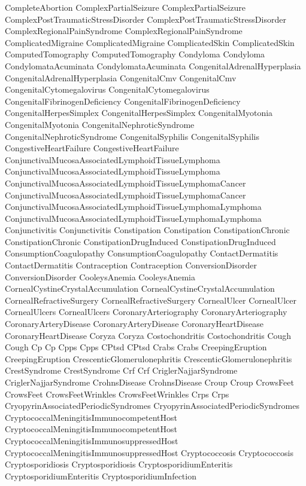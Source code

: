  CompleteAbortion
 ComplexPartialSeizure
 ComplexPartialSeizure
 ComplexPostTraumaticStressDisorder
 ComplexPostTraumaticStressDisorder
 ComplexRegionalPainSyndrome
 ComplexRegionalPainSyndrome
 ComplicatedMigraine
 ComplicatedMigraine
 ComplicatedSkin
 ComplicatedSkin
 ComputedTomography
 ComputedTomography
 Condyloma
 Condyloma
 CondylomataAcuminata
 CondylomataAcuminata
 CongenitalAdrenalHyperplasia
 CongenitalAdrenalHyperplasia
 CongenitalCmv
 CongenitalCmv
 CongenitalCytomegalovirus
 CongenitalCytomegalovirus
 CongenitalFibrinogenDeficiency
 CongenitalFibrinogenDeficiency
 CongenitalHerpesSimplex
 CongenitalHerpesSimplex
 CongenitalMyotonia
 CongenitalMyotonia
 CongenitalNephroticSyndrome
 CongenitalNephroticSyndrome
 CongenitalSyphilis
 CongenitalSyphilis
 CongestiveHeartFailure
 CongestiveHeartFailure
 ConjunctivalMucosaAssociatedLymphoidTissueLymphoma
 ConjunctivalMucosaAssociatedLymphoidTissueLymphoma
 ConjunctivalMucosaAssociatedLymphoidTissueLymphomaCancer
 ConjunctivalMucosaAssociatedLymphoidTissueLymphomaCancer
 ConjunctivalMucosaAssociatedLymphoidTissueLymphomaLymphoma
 ConjunctivalMucosaAssociatedLymphoidTissueLymphomaLymphoma
 Conjunctivitis
 Conjunctivitis
 Constipation
 Constipation
 ConstipationChronic
 ConstipationChronic
 ConstipationDrugInduced
 ConstipationDrugInduced
 ConsumptionCoagulopathy
 ConsumptionCoagulopathy
 ContactDermatitis
 ContactDermatitis
 Contraception
 Contraception
 ConversionDisorder
 ConversionDisorder
 CooleysAnemia
 CooleysAnemia
 CornealCystineCrystalAccumulation
 CornealCystineCrystalAccumulation
 CornealRefractiveSurgery
 CornealRefractiveSurgery
 CornealUlcer
 CornealUlcer
 CornealUlcers
 CornealUlcers
 CoronaryArteriography
 CoronaryArteriography
 CoronaryArteryDisease
 CoronaryArteryDisease
 CoronaryHeartDisease
 CoronaryHeartDisease
 Coryza
 Coryza
 Costochondritis
 Costochondritis
 Cough
 Cough
 Cp
 Cp
 Cpps
 Cpps
 CPtsd
 CPtsd
 Crabs
 Crabs
 CreepingEruption
 CreepingEruption
 CrescenticGlomerulonephritis
 CrescenticGlomerulonephritis
 CrestSyndrome
 CrestSyndrome
 Crf
 Crf
 CriglerNajjarSyndrome
 CriglerNajjarSyndrome
 CrohnsDisease
 CrohnsDisease
 Croup
 Croup
 CrowsFeet
 CrowsFeet
 CrowsFeetWrinkles
 CrowsFeetWrinkles
 Crps
 Crps
 CryopyrinAssociatedPeriodicSyndromes
 CryopyrinAssociatedPeriodicSyndromes
 CryptococcalMeningitisImmunocompetentHost
 CryptococcalMeningitisImmunocompetentHost
 CryptococcalMeningitisImmunosuppressedHost
 CryptococcalMeningitisImmunosuppressedHost
 Cryptococcosis
 Cryptococcosis
 Cryptosporidiosis
 Cryptosporidiosis
 CryptosporidiumEnteritis
 CryptosporidiumEnteritis
 CryptosporidiumInfection
